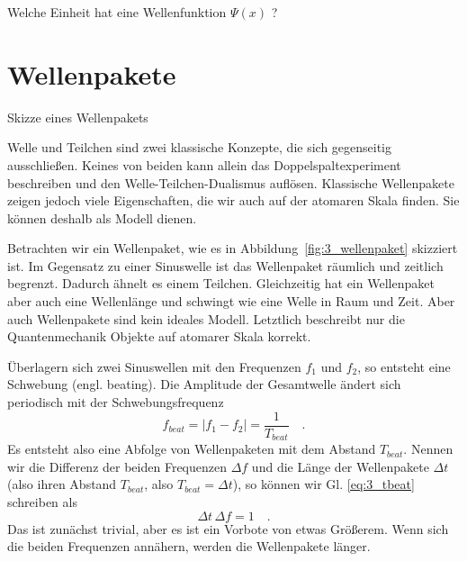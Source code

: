 \begin{questions}
    \item Welche Einheit hat eine Wellenfunktion $\Psi(x)$ ?
\end{questions}



\section{Wellenpakete}

\begin{marginfigure}
    \caption{Skizze eines Wellenpakets}
    \label{fig:3_wellenpaket}
\end{marginfigure}

Welle und Teilchen sind zwei klassische Konzepte, die sich gegenseitig ausschließen. Keines von beiden kann allein das Doppelspaltexperiment beschreiben und den Welle-Teilchen-Dualismus auflösen. Klassische Wellenpakete zeigen jedoch viele Eigenschaften, die wir auch auf der atomaren Skala finden. Sie können deshalb als Modell dienen.

Betrachten wir ein Wellenpaket, wie es in Abbildung~\ref{fig:3_wellenpaket} skizziert ist. Im Gegensatz zu einer Sinuswelle ist das Wellenpaket räumlich und zeitlich begrenzt. Dadurch ähnelt es einem Teilchen. Gleichzeitig hat ein Wellenpaket aber auch eine Wellenlänge und schwingt wie eine Welle in Raum und Zeit. Aber auch Wellenpakete sind kein ideales Modell. Letztlich beschreibt nur die Quantenmechanik Objekte auf atomarer Skala korrekt.

Überlagern sich zwei Sinuswellen mit den Frequenzen $f_1$ und $f_2$, so entsteht eine Schwebung (engl. beating). Die Amplitude der Gesamtwelle ändert sich periodisch mit der Schwebungsfrequenz
\begin{equation}
    f_{beat} = | f_1 - f_2 | = \frac{1}{T_{beat}} \quad . \label{eq:3_tbeat}
\end{equation}
Es entsteht also eine Abfolge von Wellenpaketen mit dem Abstand $T_{beat}$. Nennen wir die Differenz der beiden Frequenzen $\Delta f$ und die Länge der Wellenpakete $\Delta t$ (also ihren Abstand $T_{beat}$, also $T_{beat} = \Delta t$), so können wir Gl. \ref{eq:3_tbeat} schreiben als
\begin{equation}
    \Delta t \, \Delta f = 1 \quad .
\end{equation}
Das ist zunächst trivial, aber es ist ein Vorbote von etwas Größerem. Wenn sich die beiden Frequenzen annähern, werden die Wellenpakete länger.


